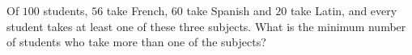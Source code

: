Of $100$ students, $56$ take French, $60$ take Spanish and $20$ take Latin, and every student takes at least one of these three subjects. What is the minimum number of students who take more than one of the subjects?
